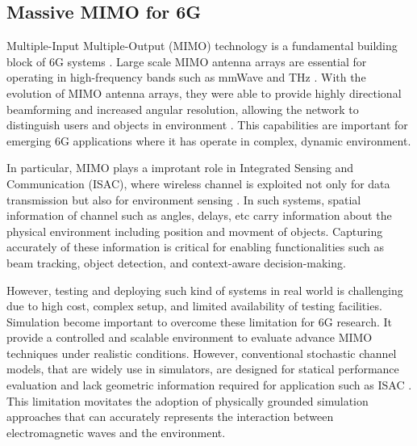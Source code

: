 \subsection{Massive MIMO for 6G}
Multiple-Input Multiple-Output (MIMO) technology is a fundamental building block of 6G systems \cite{bojovic_mimo,cazzella_dt_mimo}.
Large scale MIMO antenna arrays are essential for operating in high-frequency bands such as mmWave and THz \cite{uwaechia_mmwave,han_thz}.
With the evolution of MIMO antenna arrays, they were able to provide highly directional beamforming and increased angular resolution, allowing the network to distinguish users and objects in environment \cite{bojovic_beamforming,gao_isac_mimo}.
This capabilities are important for emerging 6G applications where it has operate in complex, dynamic environment.

In particular, MIMO plays a improtant role in Integrated Sensing and Communication (ISAC), where wireless channel is exploited not only for data transmission but also for environment sensing \cite{zhou_isac,gao_isac_mimo,hua_isac_beamforming}.
In such systems, spatial information of channel such as angles, delays, etc carry information about the physical environment including position and movment of objects.
Capturing accurately of these information is critical for enabling functionalities such as beam tracking, object detection, and context-aware decision-making.

However, testing and deploying such kind of systems in real world is challenging due to high cost, complex setup, and limited availability of testing facilities.
Simulation become important to overcome these limitation for 6G research.
It provide a controlled and scalable environment to evaluate advance MIMO techniques under realistic conditions.
However, conventional stochastic channel models, that are widely use in simulators, are designed for statical performance evaluation and lack geometric information required for application such as ISAC \cite{tr38901,alsamman_mmwave,han_thz}.
This limitation movitates the adoption of physically grounded simulation approaches that can accurately represents the interaction between electromagnetic waves and the environment.
